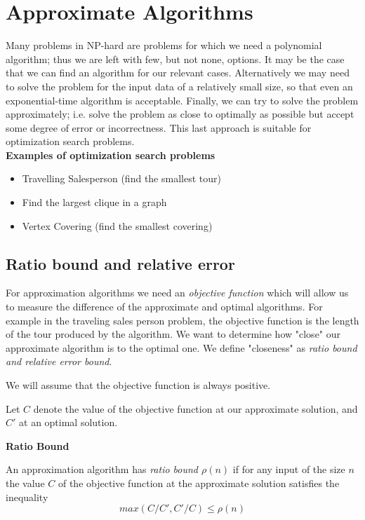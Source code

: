 \section{Approximate Algorithms}
Many problems in NP-hard are problems for which we need a polynomial algorithm;
thus we are left with few, but not none, options.
It may be the case that we can find an algorithm for our relevant cases.
Alternatively we may need to solve the problem for the input
data of a relatively small size, so that even an exponential-time algorithm is acceptable.
Finally, we can try to solve the problem approximately;
i.e. solve the problem as close to optimally as possible but accept some degree of error
or incorrectness.
This last approach is suitable for optimization search problems.\\

\textbf{Examples of optimization search problems}
\begin{itemize}
    \item Travelling Salesperson (find the smallest tour)
    \item Find the largest clique in a graph
    \item Vertex Covering (find the smallest covering)
\end{itemize}

\subsection{Ratio bound and relative error}
For approximation algorithms we need an \textit{objective function}
which will allow us to measure the difference of the approximate and optimal algorithms.
For example in the traveling sales person problem,
the objective function is the length of the tour produced by the algorithm.
We want to determine how "close" our approximate algorithm is to the
optimal one.  We define "closeness" as \textit{ratio bound and relative error bound}.

We will assume that the objective function is always positive.

Let $C$ denote the value of the objective function at our approximate solution,
and $C\prime$ at an optimal solution.

\textbf{Ratio Bound}\\
\begin{definition}
    An approximation algorithm has \textit{ratio bound $\rho(n)$}
    if for any input of the size $n$ the value $C$ of the objective function
    at the approximate solution satisfies the inequality
    $$
    max(C/C\prime, C\prime/C) \leq \rho(n)
    $$
\end{definition}

